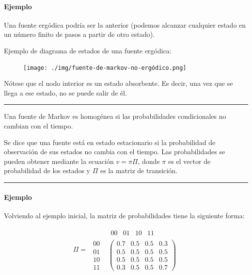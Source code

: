 \paragraph{Ejemplo}\label{ejemplo}

Una fuente ergódica podría ser la anterior (podemos alcanzar cualquier
estado en un número finito de pasos a partir de otro estado).

Ejemplo de diagrama de estados de una fuente ergódica:

\begin{figure}[htbp!]
\centering
\texttt{[image: ./img/fuente-de-markov-no-ergódico.png]}
\end{figure}

Nótese que el nodo interior es un estado absorbente. Es decir, una vez
que se llega a ese estado, no se puede salir de él.

\begin{center}\rule{0.5\linewidth}{0.5pt}\end{center}

Una fuente de Markov es homogénea si las probabilidades condicionales no
cambian con el tiempo.

Se dice que una fuente está en estado estacionario si la probabilidad de
observación de sus estados no cambia con el tiempo. Las probabilidades
se pueden obtener mediante la ecuación \(v=\pi\Pi\), donde \(\pi\) es el
vector de probabilidad de los estados y \(\Pi\) es la matriz de
transición.

\begin{center}\rule{0.5\linewidth}{0.5pt}\end{center}

\paragraph{Ejemplo}\label{ejemplo-1}

Volviendo al ejemplo inicial, la matriz de probabilidades tiene la
siguiente forma:

\[
\Pi = \begin{matrix}
& \begin{matrix} 00 & 01 & 10 & 11 \end{matrix} \\
\begin{matrix} 00 \\ 01 \\ 10 \\ 11 \end{matrix} & \begin{pmatrix} 0.7 & 0.5 & 0.5 & 0.3 \\ 0.5 & 0.5 & 0.5 & 0.5 \\ 0.5 & 0.5 & 0.5 & 0.5 \\ 0.3 & 0.5 & 0.5 & 0.7 \end{pmatrix}
\end{matrix}
\]

